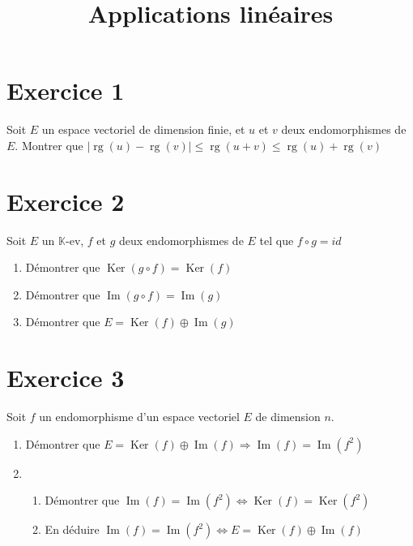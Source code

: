 \documentclass[11pt]{article}
\author{\Name \texttt{\Login}}
\date{}
\title{Applications linéaires}
\begin{document}
\maketitle

\section*{Exercice 1}

Soit $E$ un espace vectoriel de dimension finie, et $u$ et $v$ deux endomorphismes de $E$. Montrer que $|\operatorname{rg}(u)-\operatorname{rg}(v)|\leq \operatorname{rg}(u+v) \leq \operatorname{rg}(u)+\operatorname{rg}(v)$

\section*{Exercice 2}

Soit $E$ un $\mathbb{K}$-ev, $f$ et $g$ deux endomorphismes de $E$ tel que $f\circ g =id$
\begin{enumerate}
\item Démontrer que $\operatorname{Ker}(g\circ f) =\operatorname{Ker}(f)$
\item  Démontrer que $\operatorname{Im}(g\circ f) =\operatorname{Im}(g)$
\item Démontrer que $E = \operatorname{Ker}(f)\oplus \operatorname{Im}(g)$
\end{enumerate}

\section*{Exercice 3}

Soit $f$ un endomorphisme d'un espace vectoriel $E$ de dimension $n$.

\begin{enumerate}
\item Démontrer que $E = \operatorname{Ker}(f)\oplus \operatorname{Im}(f) \Rightarrow \operatorname{Im}(f) = \operatorname{Im}(f^2)$
\item
\begin{enumerate}
\item Démontrer que $\operatorname{Im}(f) = \operatorname{Im}(f^2) \Leftrightarrow \operatorname{Ker}(f) = \operatorname{Ker}(f^2)$
\item En déduire $\operatorname{Im}(f) = \operatorname{Im}(f^2) \Leftrightarrow E = \operatorname{Ker}(f)\oplus \operatorname{Im}(f)$
\end{enumerate}

\end{enumerate}
\end{document}
